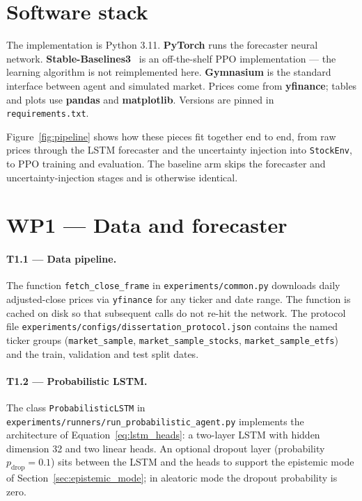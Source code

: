 \section{Software stack}
\label{sec:software_stack}

The implementation is Python 3.11. \textbf{PyTorch} runs the forecaster neural network. \textbf{Stable-Baselines3}~\parencite{raffin2021sb3} is an off-the-shelf PPO implementation --- the learning algorithm is not reimplemented here. \textbf{Gymnasium} is the standard interface between agent and simulated market. Prices come from \textbf{yfinance}; tables and plots use \textbf{pandas} and \textbf{matplotlib}. Versions are pinned in \texttt{requirements.txt}.

Figure~\ref{fig:pipeline} shows how these pieces fit together end to end, from raw prices through the LSTM forecaster and the uncertainty injection into \texttt{StockEnv}, to PPO training and evaluation. The baseline arm skips the forecaster and uncertainty-injection stages and is otherwise identical.



\section{WP1 --- Data and forecaster}
\label{sec:wp1}

\paragraph{T1.1 --- Data pipeline.} The function \texttt{fetch\_close\_frame} in \texttt{experiments/common.py} downloads daily adjusted-close prices via \texttt{yfinance} for any ticker and date range. The function is cached on disk so that subsequent calls do not re-hit the network. The protocol file \texttt{experiments/configs/dissertation\_protocol.json} contains the named ticker groups (\texttt{market\_sample}, \texttt{market\_sample\_stocks}, \texttt{market\_sample\_etfs}) and the train, validation and test split dates.

\paragraph{T1.2 --- Probabilistic LSTM.} The class \texttt{ProbabilisticLSTM} in \texttt{experiments/runners/run\_probabilistic\_agent.py} implements the architecture of Equation~\ref{eq:lstm_heads}: a two-layer LSTM with hidden dimension 32 and two linear heads. An optional dropout layer (probability $p_{\mathrm{drop}} = 0.1$) sits between the LSTM and the heads to support the epistemic mode of Section~\ref{sec:epistemic_mode}; in aleatoric mode the dropout probability is zero.

